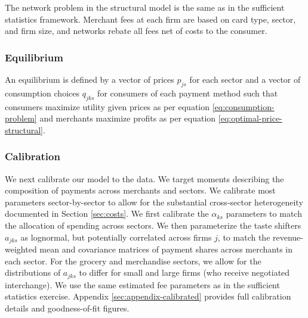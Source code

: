 \documentclass[main.tex]{subfiles}
\begin{document}
The network problem in the structural model is the same as in the sufficient statistics framework. Merchant fees at each firm are based on card type, sector, and firm size, and networks rebate all fees net of costs to the consumer.



\subsubsection{Equilibrium}
An equilibrium is defined by a vector of prices $p_{js}$ for each sector and a vector of consumption choices $q_{jks}$ for consumers of each payment method such that consumers maximize utility given prices as per equation \ref{eq:consumption-problem} and merchants maximize profits as per equation \ref{eq:optimal-price-structural}.

\subsubsection{Calibration}
We next calibrate our model to the data.
We target moments describing the composition of payments across merchants and sectors.
We calibrate most parameters sector-by-sector to allow for the substantial cross-sector heterogeneity documented in Section \ref{sec:costs}.
We first calibrate the $\alpha_{ks}$ parameters to match the allocation of spending across sectors.
We then parameterize the taste shifters $a_{jks}$ as lognormal, but potentially correlated across firms $j$, to match the revenue-weighted mean and covariance matrices of payment shares across merchants in each sector.
For the grocery and merchandise sectors, we allow for the distributions of $a_{jks}$ to differ for small and large firms (who receive negotiated interchange).
We use the same estimated fee parameters as in the sufficient statistics exercise.
Appendix \ref{sec:appendix-calibrated} provides full calibration details and goodness-of-fit figures.
\end{document}
